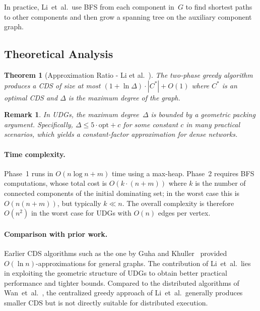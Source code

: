 \documentclass[11pt,a4paper]{article}
\newtheorem{theorem}{Theorem}
\newtheorem{remark}{Remark}
\begin{document}
In practice, Li~et~al.\ use BFS from each component in~$G$ to find shortest
paths to other components and then grow a spanning tree on the auxiliary
component graph.

\subsection{Theoretical Analysis}

\begin{theorem}[Approximation Ratio - Li et al.~\cite{li2005}]
The two-phase greedy algorithm produces a CDS of size at most
$(1 + \ln \Delta) \cdot |C^*| + O(1)$ where $C^*$ is an optimal CDS
and $\Delta$ is the maximum degree of the graph.
\end{theorem}

\begin{remark}
In UDGs, the maximum degree~$\Delta$ is bounded by a geometric packing
argument.  Specifically, $\Delta \leq 5 \cdot \text{opt} + c$ for some constant
$c$ in many practical scenarios, which yields a constant-factor approximation
for dense networks.
\end{remark}

\paragraph{Time complexity.}
Phase~1 runs in $O(n \log n + m)$ time using a max-heap.  Phase~2 requires BFS
computations, whose total cost is $O(k \cdot (n + m))$ where $k$ is the number
of connected components of the initial dominating set; in the worst case this
is $O(n(n+m))$, but typically $k \ll n$.  The overall complexity is therefore
$O(n^2)$ in the worst case for UDGs with $O(n)$ edges per vertex.

\paragraph{Comparison with prior work.}
Earlier CDS algorithms such as the one by Guha and Khuller~\cite{guha1998}
provided $O(\ln n)$-approximations for general graphs.  The contribution of
Li~et~al.\ lies in exploiting the geometric structure of UDGs to obtain better
practical performance and tighter bounds.  Compared to the distributed
algorithms of Wan~et~al.~\cite{wan2002}, the centralized greedy approach of
Li~et~al.\ generally produces smaller CDS but is not directly suitable for
distributed execution.

\end{document}
